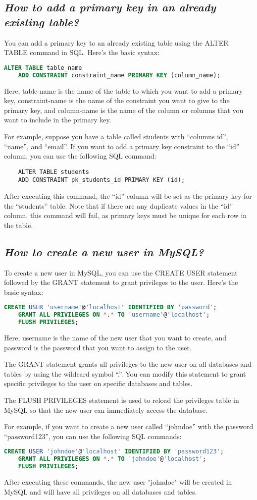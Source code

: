 \documentclass{article}
\begin{document}
\subsection{\textit{How to add a primary key in an already existing table?}}
You can add a primary key to an already existing table using the ALTER TABLE command in SQL. Here's the basic syntax:
\begin{lstlisting}[language=SQL]
    ALTER TABLE table_name
    ADD CONSTRAINT constraint_name PRIMARY KEY (column_name);
\end{lstlisting}
Here, table-name is the name of the table to which you want to add a primary key, constraint-name is the name of the constraint you want to give to the primary key, and column-name is the name of the column or columns that you want to include in the primary key.

For example, suppose you have a table called students with ``columns id'', ``name'', and ``email''. If you want to add a primary key constraint to the ``id'' column, you can use the following SQL command:
\begin{lstlisting}
    ALTER TABLE students
    ADD CONSTRAINT pk_students_id PRIMARY KEY (id);
\end{lstlisting}
After executing this command, the ``id'' column will be set as the primary key for the ``students'' table. Note that if there are any duplicate values in the ``id'' column, this command will fail, as primary keys must be unique for each row in the table.
\subsection{\textit{How to create a new user in MySQL?}}
To create a new user in MySQL, you can use the CREATE USER statement followed by the GRANT statement to grant privileges to the user. Here's the basic syntax:
\begin{lstlisting}[language=SQL]
    CREATE USER 'username'@'localhost' IDENTIFIED BY 'password';
    GRANT ALL PRIVILEGES ON *.* TO 'username'@'localhost';
    FLUSH PRIVILEGES;
\end{lstlisting}
Here, username is the name of the new user that you want to create, and password is the password that you want to assign to the user.

The GRANT statement grants all privileges to the new user on all databases and tables by using the wildcard symbol ``.''. You can modify this statement to grant specific privileges to the user on specific databases and tables.

The FLUSH PRIVILEGES statement is used to reload the privileges table in MySQL so that the new user can immediately access the database.

For example, if you want to create a new user called ``johndoe'' with the password ``password123'', you can use the following SQL commands:
\begin{lstlisting}[language=SQL]
    CREATE USER 'johndoe'@'localhost' IDENTIFIED BY 'password123';
    GRANT ALL PRIVILEGES ON *.* TO 'johndoe'@'localhost';
    FLUSH PRIVILEGES;
\end{lstlisting}
After executing these commands, the new user "johndoe" will be created in MySQL and will have all privileges on all databases and tables.
\end{document}
